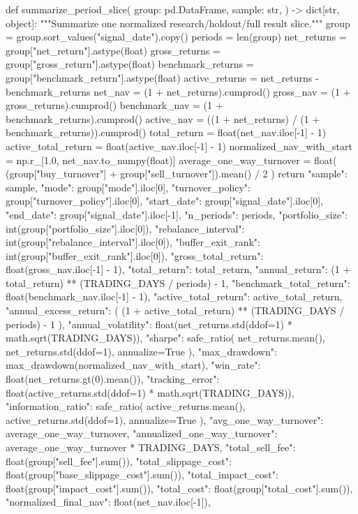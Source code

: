 \documentclass[UTF8,a4paper,fontset=fandol]{ctexart}
\begin{document}
\begin{ProjectCode}
def summarize_period_slice(
    group: pd.DataFrame,
    sample: str,
) -> dict[str, object]:
    """Summarize one normalized research/holdout/full result slice."""
    group = group.sort_values("signal_date").copy()
    periods = len(group)
    net_returns = group["net_return"].astype(float)
    gross_returns = group["gross_return"].astype(float)
    benchmark_returns = group["benchmark_return"].astype(float)
    active_returns = net_returns - benchmark_returns
    net_nav = (1 + net_returns).cumprod()
    gross_nav = (1 + gross_returns).cumprod()
    benchmark_nav = (1 + benchmark_returns).cumprod()
    active_nav = ((1 + net_returns) / (1 + benchmark_returns)).cumprod()
    total_return = float(net_nav.iloc[-1] - 1)
    active_total_return = float(active_nav.iloc[-1] - 1)
    normalized_nav_with_start = np.r_[1.0, net_nav.to_numpy(float)]
    average_one_way_turnover = float(
        (group["buy_turnover"] + group["sell_turnover"]).mean() / 2
    )
    return {
        "sample": sample,
        "mode": group["mode"].iloc[0],
        "turnover_policy": group["turnover_policy"].iloc[0],
        "start_date": group["signal_date"].iloc[0],
        "end_date": group["signal_date"].iloc[-1],
        "n_periods": periods,
        "portfolio_size": int(group["portfolio_size"].iloc[0]),
        "rebalance_interval": int(group["rebalance_interval"].iloc[0]),
        "buffer_exit_rank": int(group["buffer_exit_rank"].iloc[0]),
        "gross_total_return": float(gross_nav.iloc[-1] - 1),
        "total_return": total_return,
        "annual_return": (1 + total_return) ** (TRADING_DAYS / periods) - 1,
        "benchmark_total_return": float(benchmark_nav.iloc[-1] - 1),
        "active_total_return": active_total_return,
        "annual_excess_return": (
            (1 + active_total_return) ** (TRADING_DAYS / periods) - 1
        ),
        "annual_volatility": float(net_returns.std(ddof=1) * math.sqrt(TRADING_DAYS)),
        "sharpe": safe_ratio(
            net_returns.mean(), net_returns.std(ddof=1), annualize=True
        ),
        "max_drawdown": max_drawdown(normalized_nav_with_start),
        "win_rate": float(net_returns.gt(0).mean()),
        "tracking_error": float(active_returns.std(ddof=1) * math.sqrt(TRADING_DAYS)),
        "information_ratio": safe_ratio(
            active_returns.mean(), active_returns.std(ddof=1), annualize=True
        ),
        "avg_one_way_turnover": average_one_way_turnover,
        "annualized_one_way_turnover": average_one_way_turnover * TRADING_DAYS,
        "total_sell_fee": float(group["sell_fee"].sum()),
        "total_slippage_cost": float(group["base_slippage_cost"].sum()),
        "total_impact_cost": float(group["impact_cost"].sum()),
        "total_cost": float(group["total_cost"].sum()),
        "normalized_final_nav": float(net_nav.iloc[-1]),
    }



\end{ProjectCode}
\end{document}
